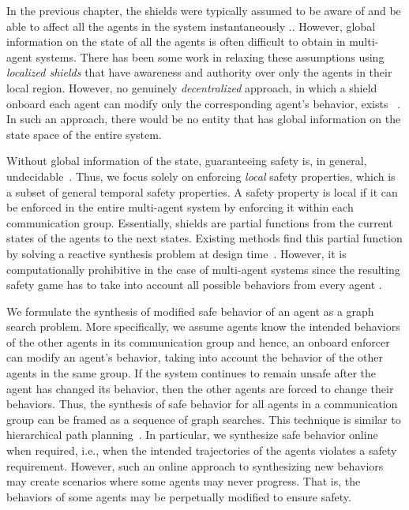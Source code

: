 
In the previous chapter, the shields were typically assumed to be aware of and be able to affect all the agents in the system instantaneously \cite{multiagentshield}.. However,
global information on the state of all the agents is often difficult to obtain in multi-agent systems. There has been some work in relaxing these assumptions using \emph{localized shields} that have awareness and authority over only the agents in their local region. However, no genuinely \emph{decentralized} approach, in which a shield onboard each agent can modify only the corresponding agent's behavior, exists ~\cite{BharNFM}. In such an approach, there would be no entity that has global information on the state space of the entire system. 

Without global information of the state, guaranteeing safety is, in general, undecidable~\cite{Schewe08}. Thus, we focus solely on enforcing \emph{local} safety properties, which is a subset of general temporal safety properties. A safety property is local if it can be enforced in the entire multi-agent system by enforcing it within each communication group. 
Essentially, shields are partial functions from the current states of the agents to the next states. 
Existing methods find this partial function by solving a reactive synthesis problem at design time~\cite{BloemKKW15,BharNFM,multiagentshield}. However, it is computationally prohibitive in the case of multi-agent systems since the resulting safety game has to take into account all possible behaviors from every agent \cite{BharNFM}. 

We formulate the synthesis of modified safe behavior of an agent as a graph search problem. More specifically, we assume agents know the intended behaviors of the other agents in its communication group and hence, an onboard enforcer can modify an agent's behavior, taking into account the behavior of the other agents in the same group. If the system continues to remain unsafe after the agent has changed its behavior, then the other agents are forced to change their behaviors. Thus, the synthesis of safe behavior for all agents in a communication group can be framed as a sequence of graph searches. This technique is similar to hierarchical path planning~\cite{Silver2005Jun}. In particular, we synthesize safe behavior online when required, i.e., when the intended trajectories of the agents violates a safety requirement. However, such an online approach to synthesizing new behaviors may create scenarios where some agents may never progress. That is, the behaviors of some agents may be perpetually modified to ensure safety.


